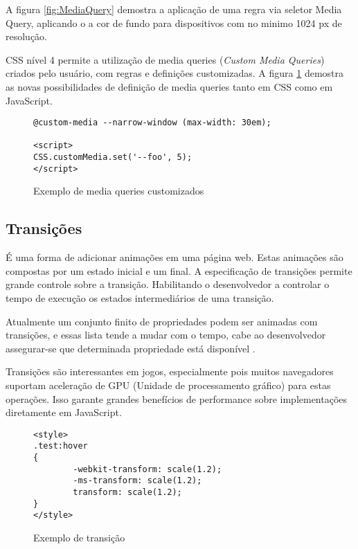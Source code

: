 A figura \ref{fig:MediaQuery} demostra a aplicação de uma regra via
seletor Media Query, aplicando o a cor de fundo para dispositivos com no
minimo 1024 px de resolução.

CSS nível 4 permite a utilização de media queries (\textit{Custom
Media Queries}) criados pelo usuário, com regras e definições
customizadas. A figura \ref{fig:MediaQueryCustom} demostra as novas
possibilidades de definição de media queries tanto em CSS como em
JavaScript.

\begin{figure}
\centering
\begin{verbatim}
@custom-media --narrow-window (max-width: 30em);

<script>
CSS.customMedia.set('--foo', 5);
</script>

\end{verbatim}
\caption{Exemplo de media queries customizados}
\label{fig:MediaQueryCustom}
\end{figure}


\subsection{Transições}

É uma forma de adicionar animações em uma página web.
Estas animações são compostas por um estado inicial e um
final. A especificação de transições permite grande controle
sobre a transição. Habilitando o desenvolvedor a controlar
o tempo de execução os estados intermediários de uma transição.

Atualmente um conjunto finito de propriedades podem ser animadas
com transições, e essas lista tende a mudar com o tempo, cabe ao
desenvolvedor assegurar-se que determinada propriedade está disponível
\autocite{mdnTransitions}.

Transições são interessantes em jogos, especialmente pois muitos
navegadores suportam aceleração de GPU (Unidade de processamento
gráfico) para estas operações. Isso garante grandes benefícios de
performance sobre implementações diretamente em JavaScript.

\begin{figure}
\centering
\begin{verbatim}
<style>
.test:hover
{
        -webkit-transform: scale(1.2);
        -ms-transform: scale(1.2);
        transform: scale(1.2);
}
</style>
\end{verbatim}
\caption{Exemplo de transição}
\label{fig:CSSTransition}
\end{figure}

